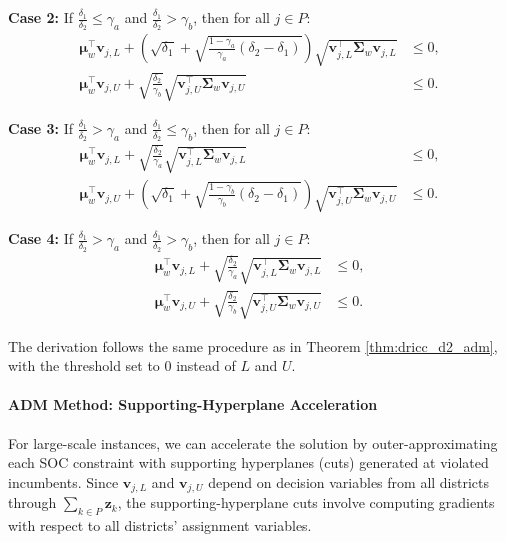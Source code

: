 \documentclass[preprint,12pt,authoryear]{elsarticle}
\begin{document}
\textbf{Case 2:} If $\frac{\delta_1}{\delta_2} \leqslant \gamma_a$ and $\frac{\delta_1}{\delta_2} > \gamma_b$, then for all $j \in P$:
\begin{align}
\boldsymbol{\mu}_w^\top \mathbf{v}_{j,L} + \left(\sqrt{\delta_1} + \sqrt{\frac{1 - \gamma_a}{\gamma_a} (\delta_2 - \delta_1)}\right) \sqrt{\mathbf{v}_{j,L}^\top \boldsymbol{\Sigma}_w \mathbf{v}_{j,L}} &\leqslant 0, \label{eq:assign_dep_rel_balance_d2_adm_case2_lower} \\
\boldsymbol{\mu}_w^\top \mathbf{v}_{j,U} + \sqrt{\frac{\delta_2}{\gamma_b}} \sqrt{\mathbf{v}_{j,U}^\top \boldsymbol{\Sigma}_w \mathbf{v}_{j,U}} &\leqslant 0. \label{eq:assign_dep_rel_balance_d2_adm_case2_upper}
\end{align}

\textbf{Case 3:} If $\frac{\delta_1}{\delta_2} > \gamma_a$ and $\frac{\delta_1}{\delta_2} \leqslant \gamma_b$, then for all $j \in P$:
\begin{align}
\boldsymbol{\mu}_w^\top \mathbf{v}_{j,L} + \sqrt{\frac{\delta_2}{\gamma_a}} \sqrt{\mathbf{v}_{j,L}^\top \boldsymbol{\Sigma}_w \mathbf{v}_{j,L}} &\leqslant 0, \label{eq:assign_dep_rel_balance_d2_adm_case3_lower} \\
\boldsymbol{\mu}_w^\top \mathbf{v}_{j,U} + \left(\sqrt{\delta_1} + \sqrt{\frac{1 - \gamma_b}{\gamma_b} (\delta_2 - \delta_1)}\right) \sqrt{\mathbf{v}_{j,U}^\top \boldsymbol{\Sigma}_w \mathbf{v}_{j,U}} &\leqslant 0. \label{eq:assign_dep_rel_balance_d2_adm_case3_upper}
\end{align}

\textbf{Case 4:} If $\frac{\delta_1}{\delta_2} > \gamma_a$ and $\frac{\delta_1}{\delta_2} > \gamma_b$, then for all $j \in P$:
\begin{align}
\boldsymbol{\mu}_w^\top \mathbf{v}_{j,L} + \sqrt{\frac{\delta_2}{\gamma_a}} \sqrt{\mathbf{v}_{j,L}^\top \boldsymbol{\Sigma}_w \mathbf{v}_{j,L}} &\leqslant 0, \label{eq:assign_dep_rel_balance_d2_adm_case4_lower} \\
\boldsymbol{\mu}_w^\top \mathbf{v}_{j,U} + \sqrt{\frac{\delta_2}{\gamma_b}} \sqrt{\mathbf{v}_{j,U}^\top \boldsymbol{\Sigma}_w \mathbf{v}_{j,U}} &\leqslant 0. \label{eq:assign_dep_rel_balance_d2_adm_case4_upper}
\end{align}

The derivation follows the same procedure as in Theorem \ref{thm:dricc_d2_adm}, with the threshold set to 0 instead of $L$ and $U$.

\paragraph{ADM Method: Supporting-Hyperplane Acceleration}
For large-scale instances, we can accelerate the solution by outer-approximating each SOC constraint with supporting hyperplanes (cuts) generated at violated incumbents. Since $\mathbf{v}_{j,L}$ and $\mathbf{v}_{j,U}$ depend on decision variables from all districts through $\sum_{k \in P} \mathbf{z}_k$, the supporting-hyperplane cuts involve computing gradients with respect to all districts' assignment variables.
\end{document}
